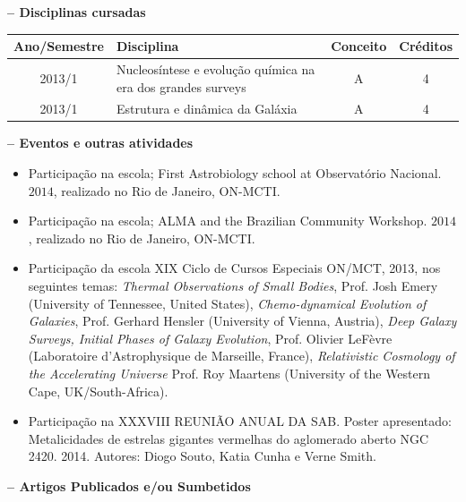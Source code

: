 \documentclass[a4paper,12pt,twoside]{article}
\begin{document}
{\bf \large -- Disciplinas cursadas}\\
\newline

{\small
\begin{tabular}{|c|l|c|c|}
\hline
Ano/Semestre & Disciplina & Conceito & Créditos \\
\hline
2013/1 & Nucleosíntese e evolução química na era dos grandes surveys 	& A & 4  \\
2013/1 & Estrutura e dinâmica da Galáxia            					& A & 4  \\

\hline
\hline
\end{tabular}
}

\vspace{1cm}
{\bf \large -- Eventos e outras atividades}

\begin{itemize}


\item Participação na escola; First Astrobiology school at Observatório Nacional. $2014$, realizado no Rio de Janeiro, ON-MCTI.\\

\item Participação na escola; ALMA and the Brazilian Community Workshop. $2014$, realizado no Rio de Janeiro, ON-MCTI.\\


\item Participação da escola XIX Ciclo de Cursos Especiais ON/MCT, 2013, nos seguintes temas: \textit{Thermal Observations of Small Bodies}, Prof. Josh Emery (University of Tennessee, United States), \textit{Chemo-dynamical Evolution of Galaxies}, Prof. Gerhard Hensler (University of Vienna, Austria), \textit{Deep Galaxy Surveys, Initial Phases of Galaxy Evolution}, Prof. Olivier LeFèvre (Laboratoire d'Astrophysique de Marseille, France), \textit{Relativistic Cosmology of the Accelerating Universe} Prof. Roy Maartens (University of the Western Cape, UK/South-Africa).\\


\item Participação na XXXVIII REUNIÃO ANUAL DA SAB. Poster apresentado: Metalicidades de estrelas gigantes vermelhas do aglomerado aberto NGC 2420. 2014. Autores: Diogo Souto, Katia Cunha e Verne Smith.\\

\end{itemize}


{\bf \large -- Artigos Publicados e/ou Sumbetidos}\\
\end{document}
